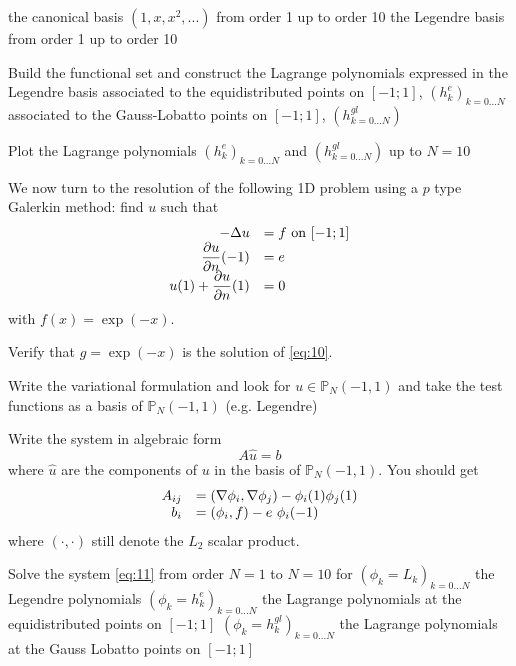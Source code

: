 \documentclass{article}
\begin{document}
\begin{Exercise}[title={p type Galerkin method in 1D}]
  \subQuestion the canonical basis $(1, x, x^2, ...)$ from order 1 up to order 10
  \subQuestion the Legendre basis from order 1 up to order 10

  \Question Build the functional set and construct the Lagrange polynomials expressed in the Legendre basis
  \subQuestion associated to the equidistributed points on $[-1;1]$, $(h^e_k)_{k=0...N}$
  \subQuestion associated to the Gauss-Lobatto points on $[-1;1]$, $(h^{gl}_{k=0...N})$



  \Question Plot the Lagrange polynomials $(h^e_k)_{k=0...N}$ and $(h^{gl}_{k=0...N})$ up to $N=10$

  \ExePart
  We now turn to the resolution of the following 1D problem using a $p$ type Galerkin method: find $u$ such that
  \begin{equation}
    \label{eq:10}
    \begin{array}[c]{rl}
      -\Delta u &= f \text{ on } [-1;1]\\
      \displaystyle \frac{\partial u}{\partial n}(-1) &= e\\
      \displaystyle u(1) + \frac{\partial u}{\partial n}(1) &= 0\\
    \end{array}
  \end{equation}
  with $f(x)=\exp(-x)$.

  \Question Verify that $g=\exp(-x)$ is the solution  of \eqref{eq:10}.

  \Question Write the variational formulation and look for $u \in
  \mathbb{P}_N(-1,1)$ and take the test functions as a basis of
  $\mathbb{P}_N(-1,1)$ (e.g. Legendre)

  \Question Write the system in algebraic form
  \begin{equation}
    \label{eq:11}
    A \hat{u} = b
  \end{equation}
  where $\hat{u}$ are the components of $u$ in the basis of
  $\mathbb{P}_N(-1,1)$.
  You should get
  \begin{equation}
    \label{eq:12}
    \begin{array}[c]{rl}
      A_{ij} &= (\nabla \phi_i, \nabla \phi_j) - \phi_i(1)\phi_j(1)\\
      b_i &= (\phi_i,f) - e\ \phi_i(-1)
    \end{array}
  \end{equation}
  where $(\cdot,\cdot)$ still denote the $L_2$ scalar product.

  \Question Solve the system \eqref{eq:11} from order $N=1$ to $N=10$ for
  \subQuestion $(\phi_k = L_k)_{k=0...N}$ the Legendre polynomials
  \subQuestion $(\phi_k = h^{e}_k)_{k=0...N}$ the Lagrange polynomials at the equidistributed points on $[-1;1]$
  \subQuestion $(\phi_k = h^{gl}_k)_{k=0...N}$ the Lagrange polynomials at the Gauss Lobatto points on $[-1;1]$


\end{Exercise}
\end{document}
